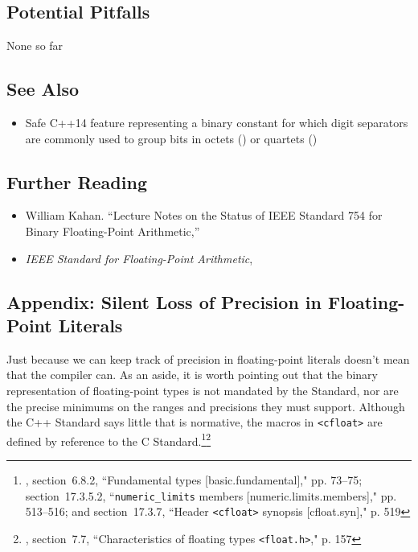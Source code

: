 \subsection[Potential Pitfalls]{Potential Pitfalls}\label{potential-pitfalls}

None so far

\subsection[See Also]{See Also}\label{see-also}

\begin{itemize}
\item{Safe C++14 feature representing a binary constant for which digit separators are commonly used to group bits in octets () or quartets ()}
\end{itemize}

\subsection[Further Reading]{Further Reading}\label{further-reading}

\begin{itemize}
\item{William Kahan. ``Lecture Notes on the Status of
IEEE Standard 754 for Binary Floating-Point Arithmetic,'' \cite{kahan97}}
\item{{\textit{IEEE Standard for Floating-Point Arithmetic}}, \cite{ieee19}}
\end{itemize} 

\subsection[Appendix: Silent Loss of Precision in Floating-Point Literals]{Appendix: Silent Loss of Precision in Floating-Point Literals}\label{appendix:-silent-loss-of-precision-in-floating-point-literals}

Just because we can keep track of precision in floating-point literals
doesn't mean that the compiler can. As an aside, it is worth
pointing out that the binary representation of floating-point types is
not mandated by the Standard, nor are the precise minimums on the ranges
and precisions they must support. Although the C++ Standard says little
that is normative, the macros in \lstinline!<cfloat>! are defined by
reference to the C Standard.\footnote{\cite{iso20b}, section~6.8.2, ``Fundamental types [basic.fundamental]," pp. 73--75; section~17.3.5.2, ``\texttt{numeric\_limits} members [numeric.limits.members]," pp. 513--516; and section~17.3.7, ``Header \texttt{<cfloat>} synopsis [cfloat.syn]," p. 519}\footnote{\cite{iso18b}, section~7.7,  
``Characteristics of floating types \texttt{<float.h>}," p. 157}

